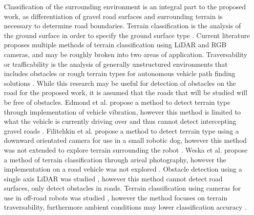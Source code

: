 \documentclass[numbered,pdftex]{ohio-etd}
\begin{document}
{{		{Classification of the surrounding environment is an integral part to the proposed work, as differentiation of gravel road surfaces and surrounding terrain is necessary to determine road boundaries. Terrain classification is the analysis of the ground surface in order to specify the ground surface type \cite{laible_3d_2012,laible_terrain_2013,laible_map_building,rasmussen_combining_2002,reymann_improving_2015,walas_terrain_2014,wietrzykowski_boosting_2014,wang_road_nodate}. Current literature proposes multiple methods of terrain classification using LiDAR and RGB cameras, and may be roughly broken into two areas of application. Traversability or trafficability is the analysis of generally unstructured environments that includes obstacles or rough terrain types for autonomous vehicle path finding solutions  \cite{schilling_geometric_2017,ojeda_terrain_2006,coombs_driving_2000,stavens_self-supervised_nodate,belter_rough_2010,bartoszyk_terrain-aware_2017,noauthor_fusion_nodate,li_rugged_2019,wilson_terrain_2014,siva_robot_2019}. While this research may be useful for detection of obstacles on the road for the proposed work, it is assumed that the roads that will be studied will be free of obstacles. Edmond et al. propose a method to detect terrain type through implementation of vehicle vibration, however this method is limited to what the vehicle is currently driving over and thus cannot detect intercepting gravel roads \cite{dupont_online_2008}. Filitchkin et al. propose a method to detect terrain type using a downward orientated camera for use in a small robotic dog, however this method was not extended to explore terrain surrounding the robot \cite{filitchkin_feature_based_2012}. Weska et al. propose a method of terrain classification through arieal photography, however the implementation on a road vehicle was not explored \cite{weszka_comparative_1976}. Obstacle detection using a single axis LiDAR was studied \cite{manduchi_obstacle_2005}, however this method cannot detect road surfaces, only detect obstacles in roads. Terrain classification using cameras for use in off-road robots was studied \cite{walch_offroad_2022}, however the method focuses on terrain traversability, furthermore ambient conditions may lower classification accuracy \cite{levi_3d_2012_light}.}
		
}}
\end{document}

